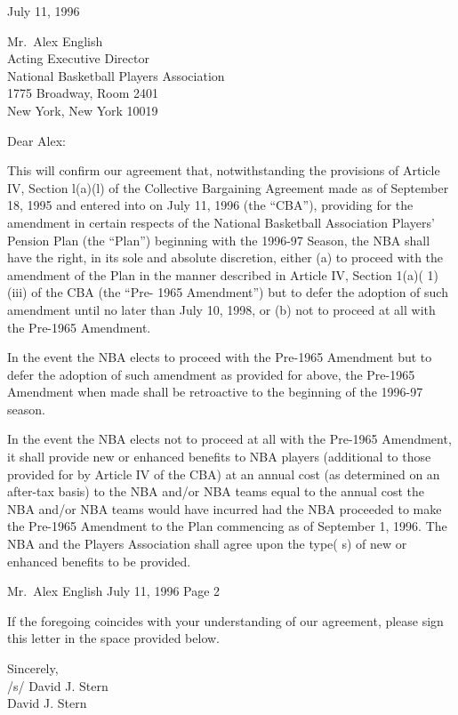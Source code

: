 \documentclass[
]{book}
\begin{document}
\newpage

July 11, 1996

Mr.~Alex English\\
Acting Executive Director\\
National Basketball Players Association\\
1775 Broadway, Room 2401\\
New York, New York 10019

Dear Alex:

This will confirm our agreement that, notwithstanding the provisions of Article IV, Section l(a)(l) of the Collective Bargaining Agreement made as of September 18, 1995 and entered into on July 11, 1996 (the ``CBA''), providing for the amendment in certain respects of the National Basketball Association Players' Pension Plan (the ``Plan'') beginning with the 1996-97 Season, the NBA shall have the right, in its sole and absolute discretion, either (a) to proceed with the amendment of the Plan in the manner described in Article IV, Section 1(a)( 1)(iii) of the CBA (the ``Pre- 1965 Amendment'') but to defer the adoption of such amendment until no later than July 10, 1998, or (b) not to proceed at all with the Pre-1965 Amendment.

In the event the NBA elects to proceed with the Pre-1965 Amendment but to defer the adoption of such amendment as provided for above, the Pre-1965 Amendment when made shall be retroactive to the beginning of the 1996-97 season.

In the event the NBA elects not to proceed at all with the Pre-1965 Amendment, it shall provide new or enhanced benefits to NBA players (additional to those provided for by Article IV of the CBA) at an annual cost (as determined on an after-tax basis) to the NBA and/or NBA teams equal to the annual cost the NBA and/or NBA teams would have incurred had the NBA proceeded to make the Pre-1965 Amendment to the Plan commencing as of September 1, 1996. The NBA and the Players Association shall agree upon the type( s) of new or enhanced benefits to be provided.

\newpage

Mr.~Alex English
July 11, 1996
Page 2

If the foregoing coincides with your understanding of our agreement, please sign this letter in the space provided below.

Sincerely,\\
/s/ David J. Stern\\
David J. Stern
\end{document}
